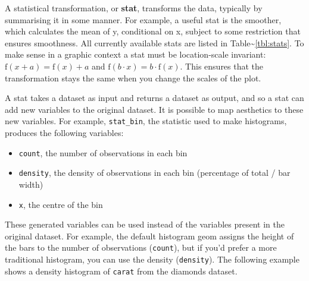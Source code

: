  


A statistical transformation, or \textbf{stat}, transforms the data,
typically by summarising it in some manner. For example, a useful stat
is the smoother, which calculates the mean of y, conditional on x,
subject to some restriction that ensures smoothness. All currently
available stats are listed in Table\textasciitilde{}\ref{tbl:stats}. To
make sense in a graphic context a stat must be location-scale invariant:
\(\mbox{f}(x + a) = \mbox{f}(x) + a\) and
\(\mbox{f}(b \cdot x) = b \cdot \mbox{f}(x)\). This ensures that the
transformation stays the same when you change the scales of the plot.



A stat takes a dataset as input and returns a dataset as output, and so
a stat can add new variables to the original dataset. It is possible to
map aesthetics to these new variables. For example, \texttt{stat\_bin},
the statistic used to make histograms, produces the following variables:
 

\begin{itemize}
\itemsep1pt\parskip0pt
\item
  \texttt{count}, the number of observations in each bin
\item
  \texttt{density}, the density of observations in each bin (percentage
  of total / bar width)
\item
  \texttt{x}, the centre of the bin
\end{itemize}

These generated variables can be used instead of the variables present
in the original dataset. For example, the default histogram geom assigns
the height of the bars to the number of observations (\texttt{count}),
but if you'd prefer a more traditional histogram, you can use the
density (\texttt{density}). The following example shows a density
histogram of \texttt{carat} from the diamonds dataset.

\begin{Shaded}
\begin{Highlighting}[]
\NormalTok{>}\StringTok{ }\StringTok{ }
\NormalTok{+}\StringTok{   }\NormalTok{(}\NormalTok{(}  \NormalTok{)}
\end{Highlighting}
\end{Shaded}

